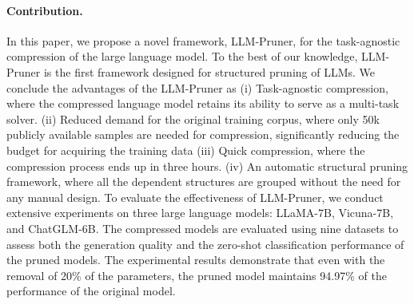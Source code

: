 \documentclass{article}
\begin{document}

\paragraph{Contribution.} In this paper,  we propose a novel framework, LLM-Pruner, for the task-agnostic compression of the large language model. To the best of our knowledge, LLM-Pruner is the first framework designed for structured pruning of LLMs. We conclude the advantages of the LLM-Pruner as (i) Task-agnostic compression, where the compressed language model retains its ability to serve as a multi-task solver. (ii) Reduced demand for the original training corpus, where only 50k publicly available samples are needed for compression, significantly reducing the budget for acquiring the training data (iii) Quick compression, where the compression process ends up in three hours. (iv) An automatic structural pruning framework, where all the dependent structures are grouped without the need for any manual design.
To evaluate the effectiveness of LLM-Pruner, we conduct extensive experiments on three large language models: LLaMA-7B, Vicuna-7B, and ChatGLM-6B. The compressed models are evaluated using nine datasets to assess both the generation quality and the zero-shot classification performance of the pruned models. The experimental results demonstrate that even with the removal of 20\% of the parameters, the pruned model maintains 94.97\% of the performance of the original model.
\end{document}
